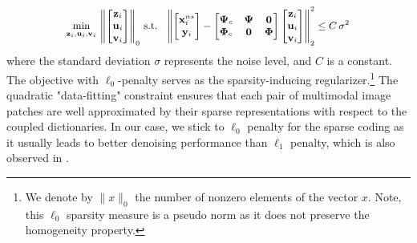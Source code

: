 \documentclass{article}
\begin{document}
\begin{equation} \label{Eq:BPDN}
\small %
\begin{array}{cl}
\underset{\mathbf{z}_i, \mathbf{u}_i,\mathbf{v}_i}{\min} 
\,
\left\| 
\begin{bmatrix}
\mathbf{z}_i \\
\mathbf{u}_i \\
\mathbf{v}_i \\
\end{bmatrix} 
\right\|_0
\,
\textrm{s.t. }
\;
\left\|
\begin{bmatrix} 
\mathbf{x}^{ns}_{i} \\ \mathbf{y}_{i}
\end{bmatrix}
-
\begin{bmatrix}
\boldsymbol{\Psi}_{c} & \boldsymbol{\Psi} & \mathbf{0} \\
\boldsymbol{\Phi}_{c} & \mathbf{0} & \boldsymbol{\Phi} \\
\end{bmatrix}
%
\begin{bmatrix}
\mathbf{z}_i \\
\mathbf{u}_i \\
\mathbf{v}_i \\
\end{bmatrix}
\right\|_2^2
\leq C \, \sigma^2
\end{array}
\end{equation}
where the standard deviation $\sigma$ represents the noise level, and $C$ is a constant. The objective with $\ell_0$-penalty serves as the sparsity-inducing regularizer.\footnote{
	We denote by $\| x\|_0$ the number of nonzero elements of the vector $x$. Note, this $\ell_0$ sparsity measure is a pseudo norm as it does not preserve the homogeneity property. 
}
The quadratic "data-fitting" constraint ensures that each pair of multimodal image patches are well approximated by their sparse representations with respect to the coupled dictionaries. 
%
In our case, we stick to $\ell_0$ penalty for the sparse coding as it usually leads to better denoising performance than $\ell_1$ penalty, which is also observed in \cite{mairal2009non,mairal2014sparse}.
\end{document}
